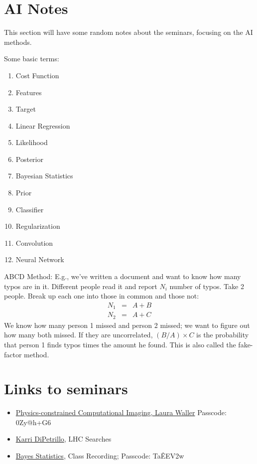 \documentclass[prd,amsmath,aps,floats,amssymb, floatfix,
  superscriptaddress,nofootinbib]{revtex4-1}
\def\vs{\nonumber\\}
\numberwithin{equation}{section}
\def\bea{\begin{eqnarray}}
\def\eea{\end{eqnarray}}
\newcommand\bei{\begin{itemize}}
\newcommand\eei{\end{itemize}}
\newcommand\bee{\begin{enumerate}}
\newcommand\eee{\end{enumerate}}
\begin{document}
 \appendix
 
  
 \section{AI Notes}\label{sec:unblind}
 This section will have some random notes about the seminars, focusing on the AI methods. 
 
 Some basic terms:
 \bee
 \item Cost Function
 \item Features
 \item Target
 \item Linear Regression
 \item Likelihood
 \item Posterior
 \item Bayesian Statistics
 \item Prior
 \item Classifier
 \item Regularization
 \item Convolution
 \item Neural Network
  \eee
  
  ABCD Method: E.g., we've written a document and want to know how many typos are in it. Different people read it and report $N_i$ number of typos. Take 2 people. Break up each one into those in common and those not:
  \bea
  N_1&=&A+B\vs
  N_2&=&A+C
  \eea
  We know how many person 1 missed and person 2 missed; we want to figure out how many both missed. If they are uncorrelated, $(B/A)\times C$ is the probability that person 1 finds typos times the amount he found. This is also called the fake-factor method.
 
 \section{Links to seminars}
 
 \bei
\item  \href{https://cmu.zoom.us/rec/share/2m9MSmtj6mbf7A_ueusvKnZIFItFV3HPI7QVJ7zlfSCCZGRzBt3iTHKs_fcKLJKx.3rNWZExDpw63YeTg}{Physics-constrained Computational Imaging, Laura Waller} Passcode: 0Zy@h+G6
 \item \href{https://cmu.box.com/s/s16xxmvut99n1fl73yooxq7kwxe6sgfo}{Karri DiPetrillo}, LHC Searches
\item \href{https://cmu.zoom.us/rec/share/tHqLS0TsN0H399MCClI3fv2_dWaraXiiAAA5R3grrEWrA-4OZjclNI4GP_njf_TW.mPFln3zm5t0xyHP7}{Bayes Statistics}, Class Recording;  Passcode: Ta\^EEV2w 
\eei
\end{document}
